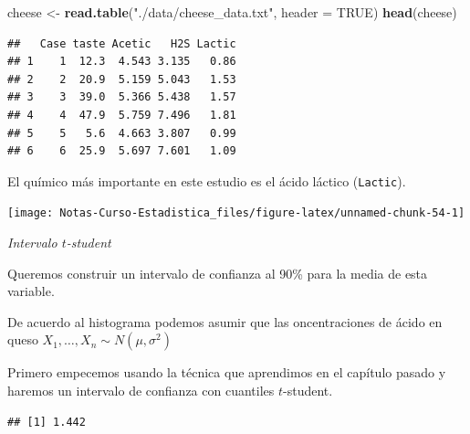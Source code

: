 \documentclass[
  12pt,
]{book}
\newenvironment{Shaded}{\begin{snugshade}}{\end{snugshade}}
\newcommand{\DataTypeTok}[1]{\textcolor[rgb]{0.13,0.29,0.53}{#1}}
\newcommand{\KeywordTok}[1]{\textcolor[rgb]{0.13,0.29,0.53}{\textbf{#1}}}
\newcommand{\NormalTok}[1]{#1}
\newcommand{\OperatorTok}[1]{\textcolor[rgb]{0.81,0.36,0.00}{\textbf{#1}}}
\newcommand{\OtherTok}[1]{\textcolor[rgb]{0.56,0.35,0.01}{#1}}
\newcommand{\StringTok}[1]{\textcolor[rgb]{0.31,0.60,0.02}{#1}}
\begin{document}
\begin{Shaded}
\begin{Highlighting}[]
\NormalTok{cheese \textless{}{-}}\StringTok{ }\KeywordTok{read.table}\NormalTok{(}\StringTok{"./data/cheese\_data.txt"}\NormalTok{, }\DataTypeTok{header =} \OtherTok{TRUE}\NormalTok{)}
\KeywordTok{head}\NormalTok{(cheese)}
\end{Highlighting}
\end{Shaded}

\begin{verbatim}
##   Case taste Acetic   H2S Lactic
## 1    1  12.3  4.543 3.135   0.86
## 2    2  20.9  5.159 5.043   1.53
## 3    3  39.0  5.366 5.438   1.57
## 4    4  47.9  5.759 7.496   1.81
## 5    5   5.6  4.663 3.807   0.99
## 6    6  25.9  5.697 7.601   1.09
\end{verbatim}

El químico más importante en este estudio es el ácido láctico (\texttt{Lactic}).

\begin{Shaded}
\end{Shaded}

\begin{center}\texttt{[image: Notas-Curso-Estadistica\_files/figure-latex/unnamed-chunk-54-1]} \end{center}

\emph{Intervalo \(t\)-student}

Queremos construir un intervalo de confianza al 90\% para la media
de esta variable.

De acuerdo al histograma podemos asumir que las oncentraciones de ácido en queso
\(X_1,\dots, X_n\sim N(\mu,\sigma^2)\)

Primero empecemos usando la técnica que aprendimos en el capítulo pasado y
haremos un intervalo de confianza con cuantiles \(t\)-student.

\begin{Shaded}
\end{Shaded}

\begin{verbatim}
## [1] 1.442
\end{verbatim}
\end{document}
